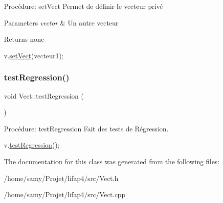 Procédure\+: set\+Vect Permet de définir le vecteur privé 


\begin{DoxyParams}{Parameters}
{\em vector} & Un autre vecteur \\
\hline
\end{DoxyParams}
\begin{DoxyReturn}{Returns}
none 
\begin{DoxyCode}
v.\hyperlink{classVect_a28408435bc900905d3416aef70140cd9}{setVect}(vecteur1);
\end{DoxyCode}
 
\end{DoxyReturn}
\mbox{\label{classVect_a734074001bba32f3d76e5cee612864f1}} 
\subsubsection{\texorpdfstring{test\+Regression()}{testRegression()}}
{\footnotesize\ttfamily void Vect\+::test\+Regression (\begin{DoxyParamCaption}{ }\end{DoxyParamCaption})}



Procédure\+: test\+Regression Fait des tests de Régression. 


\begin{DoxyCode}
v.\hyperlink{classVect_a734074001bba32f3d76e5cee612864f1}{testRegression}();
\end{DoxyCode}
 

The documentation for this class was generated from the following files\+:\begin{DoxyCompactItemize}
\item 
/home/samy/\+Projet/lifap4/src/Vect.\+h\item 
/home/samy/\+Projet/lifap4/src/Vect.\+cpp\end{DoxyCompactItemize}
